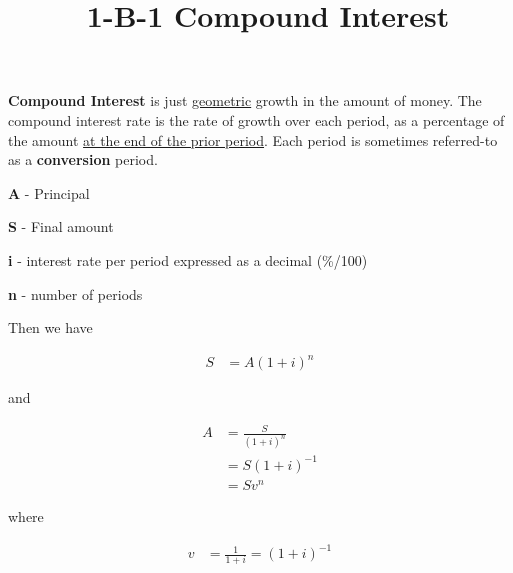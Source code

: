 \documentclass[12pt]{article}
\title{\normalfont\ 1-B-1 Compound Interest} %
\author{} %
\date{}  %
\begin{document}
\maketitle %

\vspace{-1in}

\begin{flushleft}
    \textbf{Compound Interest} is just \underline{geometric} growth in the amount of money.
    The compound interest rate is the rate of growth over each period, as a percentage of
    the amount \underline{at the end of the prior period}.  Each period is sometimes referred-to
    as a \textbf{conversion} period.
\end{flushleft}
\vspace{.1in}

\begin{description}
    \item\textbf{A} - Principal
    \item\textbf{S} - Final amount
    \item\textbf{i} - interest rate per period expressed as a decimal {(\%/100)}
    \item\textbf{n} - number of periods
\end{description}
\vspace{.1in}

\begin{flushleft}
    Then we have
\end{flushleft}

\begin{align*}
    S & = A(1 + i)^n
\end{align*}

\begin{flushleft}
    and
\end{flushleft}

\begin{align*}
    A & = \frac{S}{(1 + i)^n} \\
      & = S(1+i)^{-1}         \\
      & = Sv^n
\end{align*}

\begin{flushleft}
    where
\end{flushleft}

\begin{align*}
    v & = \frac{1}{1 + i} = (1+i)^{-1}
\end{align*}
\vspace{.25in}
\end{document}
